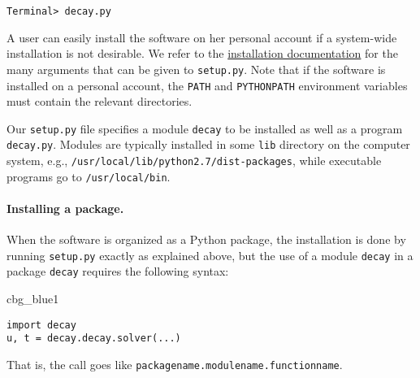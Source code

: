 \documentclass[graybox,sectrefs,envcountresetchap,open=right,final]{svmonodo}
\newenvironment{_cod_tight}[1]{
   \def\FrameCommand{\colorbox{#1}}
   \FrameRule0.6pt\MakeFramed {\FrameRestore}\vskip3mm}
   {\vskip0mm\endMakeFramed}
\newenvironment{cod}[1]{
\bgroup\rmfamily
\fboxsep=0mm\relax
\begin{_cod_tight}{#1}
\list{}{\parsep=-2mm\parskip=0mm\topsep=0pt\leftmargin=2mm
\rightmargin=2\leftmargin\leftmargin=4pt\relax}
\item\relax}
{\endlist\end{_cod_tight}\egroup}
\begin{document}
\begin{Verbatim}[frame=lines,label=\fbox{{\tiny Terminal}},framesep=2.5mm,framerule=0.7pt,fontsize=\fontsize{9pt}{9pt}]
Terminal> decay.py
\end{Verbatim}

A user can easily install the software on her personal account if
a system-wide installation is not desirable. We refer to the
\href{{https://docs.python.org/2/install/index.html#alternate-installation}}{installation documentation} for the many arguments that can be given to \texttt{setup.py}.
Note that if the software is installed on a personal account, the
\texttt{PATH} and \texttt{PYTHONPATH} environment variables must contain the
relevant directories.

Our \texttt{setup.py} file specifies a module \texttt{decay} to be installed as well
as a program \texttt{decay.py}.  Modules are typically installed in some \texttt{lib}
directory on the computer system, e.g.,
\texttt{/usr/local/lib/python2.7/dist-packages}, while executable programs go
to \texttt{/usr/local/bin}.


\paragraph{Installing a package.}
When the software is organized as a Python package, the installation is
done by running \texttt{setup.py} exactly as explained above, but the use of a module
\texttt{decay} in a package \texttt{decay} requires the following syntax:

\begin{cod}{cbg_blue1}\begin{Verbatim}[numbers=none,fontsize=\fontsize{9pt}{9pt},baselinestretch=0.95,xleftmargin=2mm]
import decay
u, t = decay.decay.solver(...)
\end{Verbatim}
\end{cod}
\noindent
That is, the call goes like \texttt{packagename.modulename.functionname}.
\end{document}
